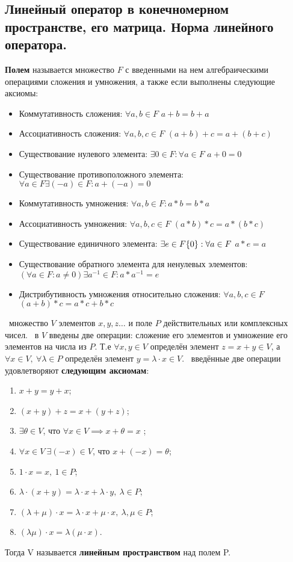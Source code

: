 \subsection{Линейный оператор в конечномерном пространстве, его матрица. Норма линейного оператора.}


\textbf{Полем} называется множество $F$ с введенными на нем алгебраическими операциями сложения и умножения, а также если выполнены следующие аксиомы:
\begin{itemize}
    \item Коммутативность сложения: $\forall a,b \in F$ $a + b = b + a$
    \item Ассоциативность сложения: $\forall a,b,c \in F$ $(a + b) + c = a + (b + c)$
    \item Существование нулевого элемента: $\exists 0 \in F: \forall a \in F$ $a + 0 = 0$
    \item Существование противоположного элемента: $\forall a \in F \exists (-a) \in F: a + (-a) = 0$
    \item Коммутативность умножения: $\forall a, b \in F: a * b = b * a$
    \item Ассоциативность умножения: $\forall a,b,c \in F$ $(a * b) * c = a * (b * c)$
    \item Существование единичного элемента: $\exists e \in F\\ \{0\}: \forall a \in F$ $a * e = a$ 
    \item Существование обратного элемента для ненулевых элементов: $ (\forall a \in F: a \neq 0) \exists a^{-1} \in F: a * a^{-1} = e$
    \item Дистрибутивность умножения относительно сложения: $\forall a,b,c \in F$ $(a + b) *c = a * c + b * c$
\end{itemize}


\faEye \ множество $V$ элементов $x, y, z\dots$ и поле $P$ действительных или комплексных чисел. \mathLet \ в $V$ введены две операции: сложение его элементов и умножение его элементов на числа из $P$. 
Т.е $\forall x,y \in V$ определён элемент $z = x+y \in V$, а $\forall x \in V, ~ \forall \lambda \in P$ определён элемент $y = \lambda \cdot x \in  V$. \mathLet \ введённые две операции удовлетворяют \textbf{следующим аксиомам}:
\begin{enumerate}
    \item $x+y=y+x$;
    \item $(x+y)+z=x+(y+z)$;
    \item $\exists \theta\in V$, что $\forall x\in V \implies x+\theta=x$ ;
    \item $\forall x \in V ~ \exists (-x) \in V$, что $x + (-x) = \theta$;
    \item $1 \cdot x = x,~1 \in P$;
    \item $\lambda \cdot(x+y)=\lambda \cdot x+\lambda \cdot y,~\lambda \in P$;
    \item $(\lambda +\mu)\cdot x=\lambda \cdot x+\mu \cdot x,~\lambda,\mu \in P$;
    \item $(\lambda \mu )\cdot x = \lambda (\mu \cdot x)$.
\end{enumerate}
Тогда V называется \textbf{линейным пространством} над полем P.

